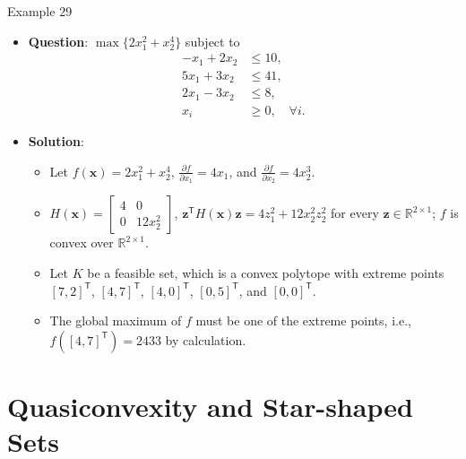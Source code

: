\documentclass[aspectratio=169,hyperref,UTF8,CJK]{beamer}
\newcommand{\R}{\mathbb{R}}
\newcommand{\trans}{\mathsf{T}}
\newcommand{\vect}[1]{\boldsymbol{#1}}
\begin{document}
\begin{frame}{Example 29}
  \scriptsize
  \begin{itemize}
    \item \textbf{Question}: $\max\{2x_1^2+x_2^4\}$ subject to
      \begin{align*}
        -x_1+2x_2&\le10,\\
        5x_1+3x_2&\le41,\\
        2x_1-3x_2&\le8,\\
        x_i&\ge0,\quad\forall i.
      \end{align*}
    \item \textbf{Solution}:
      \begin{itemize}
        \item Let $f(\vect{x})=2x_1^2+x_2^4$, $\frac{\partial f}{\partial x_1}=4x_1$, and $\frac{\partial f}{\partial x_2}=4x_2^3$.
        \item $H(\vect{x})=\begin{bmatrix}4&0\\0&12x_2^2\end{bmatrix}$,
          $\vect{z}^{\trans}H(\vect{x})\vect{z}=4z_1^2+12x_2^2z_2^2$ for every $\vect{z}\in\R^{2\times1}$; $f$ is convex over $\R^{2\times1}$.
        \item Let $K$ be a feasible set, which is a convex polytope with extreme points $[7,2]^{\trans}$, $[4,7]^{\trans}$, $[4,0]^{\trans}$, $[0,5]^{\trans}$, and $[0,0]^{\trans}$.
        \item The global maximum of $f$ must be one of the extreme points, i.e., $f([4,7]^{\trans})=2433$ by calculation.
      \end{itemize}
  \end{itemize}
\end{frame}

\section{Quasiconvexity and Star-shaped Sets}
\end{document}
